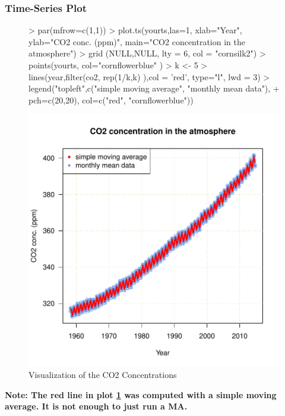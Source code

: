 \documentclass[11pt, a4paper]{article} %
\begin{document}
\subsubsection{Time-Series Plot}
\begin{figure}[H]
\centering
\begin{Schunk}
\begin{Sinput}
> par(mfrow=c(1,1))
> plot.ts(yourts,las=1, xlab="Year", ylab="CO2 conc. (ppm)", main="CO2 concentration in the atmosphere")
> grid (NULL,NULL, lty = 6, col = "cornsilk2")
> points(yourts, col="cornflowerblue" )
> k <- 5
> lines(year,filter(co2, rep(1/k,k) ),col = 'red', type="l", lwd = 3)
> legend("topleft",c("simple moving average", "monthly mean data"),
+ pch=c(20,20), col=c("red", "cornflowerblue"))
\end{Sinput}
\end{Schunk}
\includegraphics{alles-fig1visualize}
\caption{Visualization of the CO2 Concentrations}
\label{fig1visualize}
\end{figure}
\noindent \textbf{Note: The red line in plot \ref{fig1visualize} was computed with a simple moving average. It is not enough to just run a MA.}\\
\end{document}
